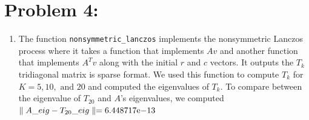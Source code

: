 \newpage
\section*{Problem 4:}
\begin{enumerate}
\item The function \texttt{nonsymmetric\_lanczos} implements the nonsymmetric Lanczos process where it takes a function that implements $Av$ and another function that implements $A^{T}v$ along with the initial $r$ and $c$ vectors. It outputs the $T_{k}$ tridiagonal matrix is sparse format. We used this function to compute $T_{k} $ for $K=5, 10, \text{\ and\ } 20$ and computed the eigenvalues of $T_{k}$. To compare between the eigenvalue of $T_{20}$ and $A$'s eigenvalues, we computed $\parallel A\_eig - T_{20}\_eig\parallel ={6.448717}\mathrm{e}{-13}$



\end{enumerate}

